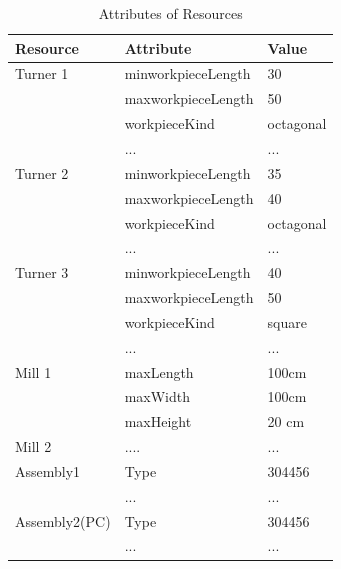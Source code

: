 \begin{table}[htb!]
	\centering
	\begin{tabular}{|l||l|l|}
		\hline
		Resource & Attribute & Value \\ 
		\hline
		\hline
		Turner 1 & minworkpieceLength & 30 \\
		\hline 
		& maxworkpieceLength & 50\\
		\hline
		& workpieceKind & octagonal\\
		\hline
		&...&...\\
		\hline
		Turner 2 & minworkpieceLength & 35\\
		\hline
		& maxworkpieceLength & 40\\
		\hline
		& workpieceKind & octagonal\\
		\hline
		&...&...\\
		\hline
		Turner 3&minworkpieceLength & 40 \\
		\hline
		& maxworkpieceLength & 50\\
		\hline
		& workpieceKind & square\\
		\hline		
		&...&...\\
		\hline
		Mill 1& maxLength & 100cm \\
		\hline
		& maxWidth & 100cm\\
		\hline
		& maxHeight & 20 cm\\
		\hline
		Mill 2& .... & ... \\
		\hline
		Assembly1 & Type & 304456\\
		\hline
		& ... & ...\\
		\hline
		Assembly2(PC) & Type & 304456\\
		\hline
		& ... & ...\\
		\hline
	\end{tabular} 
	\caption{Attributes of Resources} 
	\label{tab:intagents}
\end{table}

